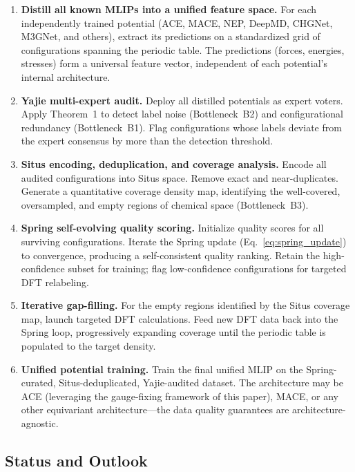 \documentclass[twoside,prb,aps,floatfix,superscriptaddress,longbibliography]{revtex4-2}
\begin{document}
\begin{enumerate}[label=\textbf{Stage \arabic*:}]
    \item \textbf{Distill all known MLIPs into a unified feature space.} For each independently trained potential (ACE, MACE, NEP, DeepMD, CHGNet, M3GNet, and others), extract its predictions on a standardized grid of configurations spanning the periodic table. The predictions (forces, energies, stresses) form a universal feature vector, independent of each potential's internal architecture.
    \item \textbf{Yajie multi-expert audit.} Deploy all distilled potentials as expert voters. Apply Theorem~1 to detect label noise (Bottleneck~B2) and configurational redundancy (Bottleneck~B1). Flag configurations whose labels deviate from the expert consensus by more than the detection threshold.
    \item \textbf{Situs encoding, deduplication, and coverage analysis.} Encode all audited configurations into Situs space. Remove exact and near-duplicates. Generate a quantitative coverage density map, identifying the well-covered, oversampled, and empty regions of chemical space (Bottleneck~B3).
    \item \textbf{Spring self-evolving quality scoring.} Initialize quality scores for all surviving configurations. Iterate the Spring update (Eq.~\ref{eq:spring_update}) to convergence, producing a self-consistent quality ranking. Retain the high-confidence subset for training; flag low-confidence configurations for targeted DFT relabeling.
    \item \textbf{Iterative gap-filling.} For the empty regions identified by the Situs coverage map, launch targeted DFT calculations. Feed new DFT data back into the Spring loop, progressively expanding coverage until the periodic table is populated to the target density.
    \item \textbf{Unified potential training.} Train the final unified MLIP on the Spring-curated, Situs-deduplicated, Yajie-audited dataset. The architecture may be ACE (leveraging the gauge-fixing framework of this paper), MACE, or any other equivariant architecture---the data quality guarantees are architecture-agnostic.
\end{enumerate}

\subsection{Status and Outlook}
\end{document}
